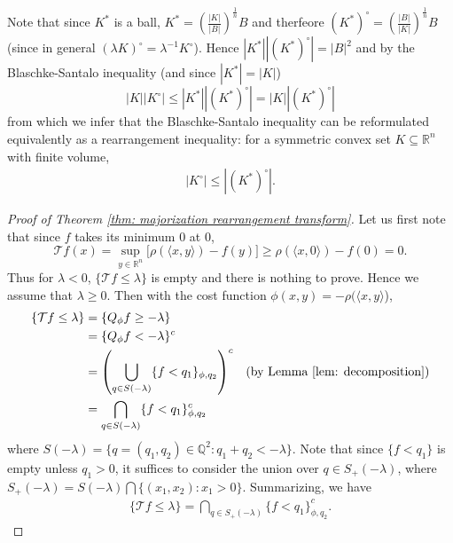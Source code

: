 \documentclass[11pt]{article}
\newcommand{\1}{[1]}
\begin{document}
Note that since $K^*$ is a ball,
$K^*=\left( \frac{|K|}{|B|}\right)^\frac{1}{n}B$
and therfeore $(K^*)^\circ = \left( \frac{|B|}{|K|}\right)^\frac{1}{n}B$ (since in general $(\lambda K)^\circ = \lambda^{-1} K^\circ$). Hence
$|K^*||(K^*)^\circ|=|B|^2$ and by the 
Blaschke-Santalo inequality (and since $|K^*|=|K|$)
$$
|K||K^\circ| \leq |K^*||(K^*)^\circ| = |K||(K^*)^\circ| 
$$
from which we infer that the Blaschke-Santalo inequality can be reformulated equivalently as a rearrangement inequality: for a symmetric convex set $K \subseteq \mathbb{R}^n$ with finite volume,
\begin{align} \label{thm: Blaschke-Santalo rearrangement bis}
    |K^\circ| \leq | (K^*)^\circ|.
\end{align}


\begin{proof}[Proof of Theorem \ref{thm: majorization rearrangement transform}]
    Let us first note that since $f$ takes its minimum $0$ at $0$, 
        \[
            \mathcal{T}f(x) = \sup_{y \in \mathbb{R}^n} \big[ \rho(\langle x,y\rangle) - f(y) \big] \geq \rho(\langle x ,0 \rangle) - f(0) = 0.
        \]
    Thus for $\lambda < 0$, $\{ \mathcal{T} f \leq \lambda \}$ is empty and there is nothing to prove.
   Hence we assume that $\lambda \geq 0$. Then with the cost function $\phi(x,y) = -\rho(\langle x,y \rangle$),
    \begin{align*}
        \{ \mathcal{T}f \leq \lambda \} 
            &=
                \{ Q_\phi f \geq - \lambda \}
                    \\
            &=
                \{ Q_\phi f < - \lambda \}^c
                    \\
            &=
               \left( \bigcup_{q \in S(-\lambda)} \{ f < q_1 \}_{\phi,q_2} \right)^c
               & (\mbox{by Lemma } \ref{lem: decomposition})
                    \\
            &=
                \bigcap_{q \in S(-\lambda)} \{ f < q_1 \}_{\phi,q_2}^c
    \end{align*}
    where 
    $S(-\lambda) = \{q = (q_1,q_2) \in \mathbb{Q}^2 :  q_1 + q_2 < - \lambda \}$.  
    Note that since $\{ f < q_1 \}$ is empty unless $q_1 > 0$, it suffices to consider the union over $q \in S_+(-\lambda)$, where $S_+(-\lambda) = S(-\lambda) \bigcap \{(x_1,x_2): x_1 > 0 \}$. 
    Summarizing, we have
    \begin{align} \label{eq: exp transform sublevel set}
        \{ \mathcal{T} f \leq \lambda \} = \bigcap_{q \in S_+(-\lambda)} \{ f < q_1 \}_{\phi,q_2}^c .

\end{align}
\end{proof}
\end{document}
